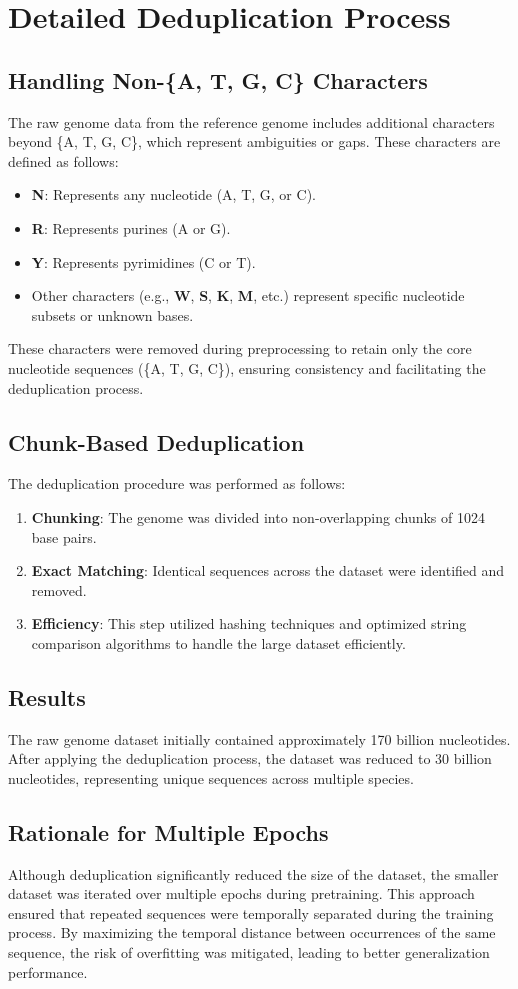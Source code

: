 \section{Detailed Deduplication Process}
\label{app:deduplication}
\subsection{Handling Non-\{A, T, G, C\} Characters}
The raw genome data from the reference genome includes additional characters beyond \{A, T, G, C\}, which represent ambiguities or gaps. These characters are defined as follows:
\begin{itemize}
    \item \textbf{N}: Represents any nucleotide (A, T, G, or C).
    \item \textbf{R}: Represents purines (A or G).
    \item \textbf{Y}: Represents pyrimidines (C or T).
    \item Other characters (e.g., \textbf{W}, \textbf{S}, \textbf{K}, \textbf{M}, etc.) represent specific nucleotide subsets or unknown bases.
\end{itemize}
These characters were removed during preprocessing to retain only the core nucleotide sequences (\{A, T, G, C\}), ensuring consistency and facilitating the deduplication process.

\subsection{Chunk-Based Deduplication}
The deduplication procedure was performed as follows:
\begin{enumerate}
    \item \textbf{Chunking}: The genome was divided into non-overlapping chunks of 1024 base pairs.
    \item \textbf{Exact Matching}: Identical sequences across the dataset were identified and removed.
    \item \textbf{Efficiency}: This step utilized hashing techniques and optimized string comparison algorithms to handle the large dataset efficiently.
\end{enumerate}

\subsection{Results}
The raw genome dataset initially contained approximately 170 billion nucleotides. After applying the deduplication process, the dataset was reduced to 30 billion nucleotides, representing unique sequences across multiple species.

\subsection{Rationale for Multiple Epochs}
Although deduplication significantly reduced the size of the dataset, the smaller dataset was iterated over multiple epochs during pretraining. This approach ensured that repeated sequences were temporally separated during the training process. By maximizing the temporal distance between occurrences of the same sequence, the risk of overfitting was mitigated, leading to better generalization performance.